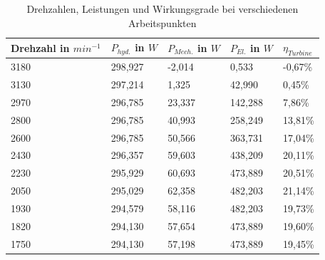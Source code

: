 \begin{table}[H]
  \caption{Drehzahlen, Leistungen und Wirkungsgrade bei verschiedenen Arbeitspunkten}
  \centering
  \begin{tabular}{|l|l|l|l|l|}
      \hline
      \rowcolor[HTML]{70AD47} 
      Drehzahl in $min^{-1}$ & $P_{hyd.}$ in $W$ & $P_{Mech.}$ in $W$ & $P_{El.}$ in $W$ & \cellcolor[HTML]{5B9BD5}$\eta_{Turbine}$ \\ \hline \hline
      \rowcolor[HTML]{E2EFDA} 
      \rowcolor[HTML]{E2EFDA} 
      3180                                & 298,927      & -2,014        & 0,533       & \cellcolor[HTML]{DDEBF7}-0,67\%      \\ \hline
      \rowcolor[HTML]{A9D08E} 
      3130                                & 297,214      & 1,325         & 42,990      & \cellcolor[HTML]{BDD7EE}0,45\%       \\ \hline
      \rowcolor[HTML]{E2EFDA} 
      2970                                & 296,785      & 23,337        & 142,288     & \cellcolor[HTML]{DDEBF7}7,86\%       \\ \hline
      \rowcolor[HTML]{A9D08E} 
      2800                                & 296,785      & 40,993        & 258,249     & \cellcolor[HTML]{BDD7EE}13,81\%      \\ \hline
      \rowcolor[HTML]{E2EFDA} 
      2600                                & 296,785      & 50,566        & 363,731     & \cellcolor[HTML]{DDEBF7}17,04\%      \\ \hline
      \rowcolor[HTML]{A9D08E} 
      2430                                & 296,357      & 59,603        & 438,209     & \cellcolor[HTML]{BDD7EE}20,11\%      \\ \hline
      \rowcolor[HTML]{E2EFDA} 
      2230                                & 295,929      & 60,693        & 473,889     & \cellcolor[HTML]{DDEBF7}20,51\%      \\ \hline
      \rowcolor[HTML]{A9D08E} 
      2050                                & 295,029      & 62,358        & 482,203     & \cellcolor[HTML]{BDD7EE}21,14\%      \\ \hline
      \rowcolor[HTML]{E2EFDA} 
      1930                                & 294,579      & 58,116        & 482,203     & \cellcolor[HTML]{DDEBF7}19,73\%      \\ \hline
      \rowcolor[HTML]{A9D08E} 
      1820                                & 294,130      & 57,654        & 473,889     & \cellcolor[HTML]{BDD7EE}19,60\%      \\ \hline
      \rowcolor[HTML]{E2EFDA} 
      1750                                & 294,130      & 57,198        & 473,889     & \cellcolor[HTML]{DDEBF7}19,45\%      \\ \hline

\end{tabular}
\end{table}
